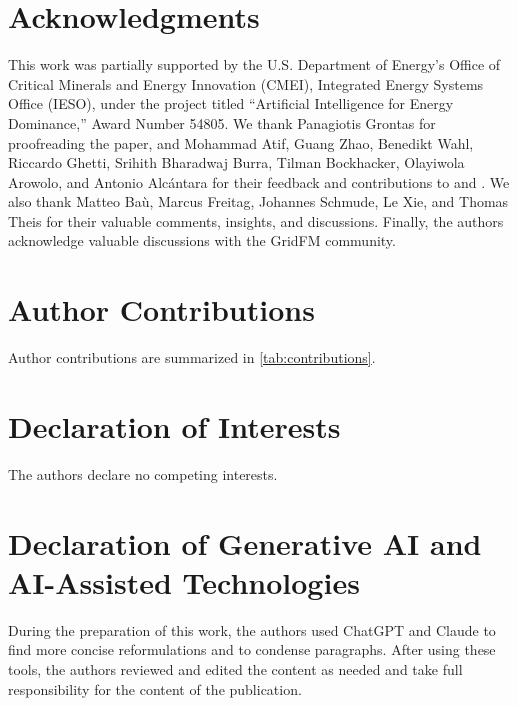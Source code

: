 \section*{Acknowledgments}

This work was partially supported by the U.S. Department of Energy’s Office of Critical Minerals and Energy Innovation (CMEI), Integrated Energy Systems Office (IESO), under the project titled “Artificial Intelligence for Energy Dominance,” Award Number 54805. We thank Panagiotis Grontas for proofreading the paper, and Mohammad Atif, Guang Zhao, Benedikt Wahl, Riccardo Ghetti, Srihith Bharadwaj Burra, Tilman Bockhacker, Olayiwola Arowolo, and Antonio Alcántara for their feedback and contributions to \graphkit and \datakit. We also thank Matteo Baù, Marcus Freitag, Johannes Schmude, Le Xie, and Thomas Theis for their valuable comments, insights, and discussions. Finally, the authors acknowledge valuable discussions with the GridFM community.



\section*{Author Contributions}
Author contributions are summarized in \cref{tab:contributions}.

\section*{Declaration of Interests}
The authors declare no competing interests.

\section*{Declaration of Generative AI and AI-Assisted Technologies}
During the preparation of this work, the authors used ChatGPT and Claude to find more concise reformulations and to condense paragraphs. After using these tools, the authors reviewed and edited the content as needed and take full responsibility for the content of the publication.